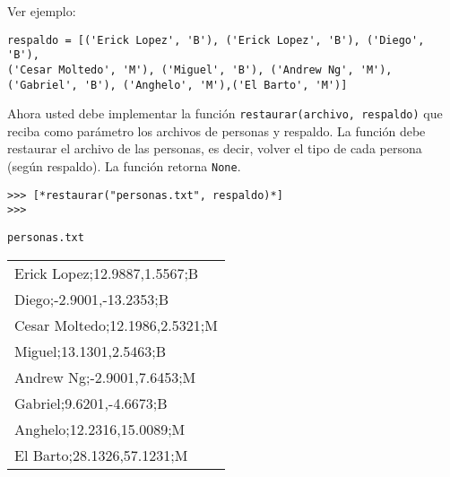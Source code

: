 \begin{enumerate}
Ver ejemplo:

\begin{lstlisting}[style=consola]
respaldo = [('Erick Lopez', 'B'), ('Erick Lopez', 'B'), ('Diego', 'B'), 
('Cesar Moltedo', 'M'), ('Miguel', 'B'), ('Andrew Ng', 'M'), 
('Gabriel', 'B'), ('Anghelo', 'M'),('El Barto', 'M')]
\end{lstlisting}

Ahora usted debe implementar la función \texttt{restaurar(archivo, respaldo)} que reciba
como parámetro los archivos de personas y respaldo. La función debe restaurar el archivo de las personas,
es decir, volver el tipo de cada persona (según respaldo). La función retorna \texttt{None}.

\begin{lstlisting}[style=consola]
>>> [*restaurar("personas.txt", respaldo)*]
>>> 
\end{lstlisting}

\begin{center}
\texttt{personas.txt}\\
	\begin{tabular}{|l|}
		\hline
Erick Lopez;12.9887,1.5567;B\\
Diego;-2.9001,-13.2353;B\\
Cesar Moltedo;12.1986,2.5321;M\\
Miguel;13.1301,2.5463;B\\
Andrew Ng;-2.9001,7.6453;M\\
Gabriel;9.6201,-4.6673;B\\
Anghelo;12.2316,15.0089;M\\
El Barto;28.1326,57.1231;M\\
		\hline
	\end{tabular}
\end{center}

\end{enumerate}
